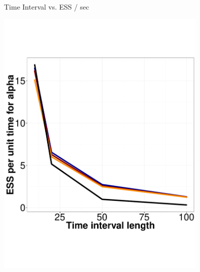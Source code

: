 \begin{figure}
\begin{minipage}[hp]{0.45\linewidth}
    \vspace{-0 in}
  \end{minipage}
    \caption{Time Interval vs. ESS / sec}
     \label{fig:TSS}
  \end{figure}


  \begin{figure}%
  \centering
  \begin{minipage}[hp]{0.45\linewidth}
  \centering
    \includegraphics [width=0.90\textwidth, angle=0]{figs/ESS_vs_t_alpha_fixobservation.pdf}
    \end{minipage}
  \begin{minipage}[hp]{0.45\linewidth}
  \centering

\end{minipage}
\end{figure}
